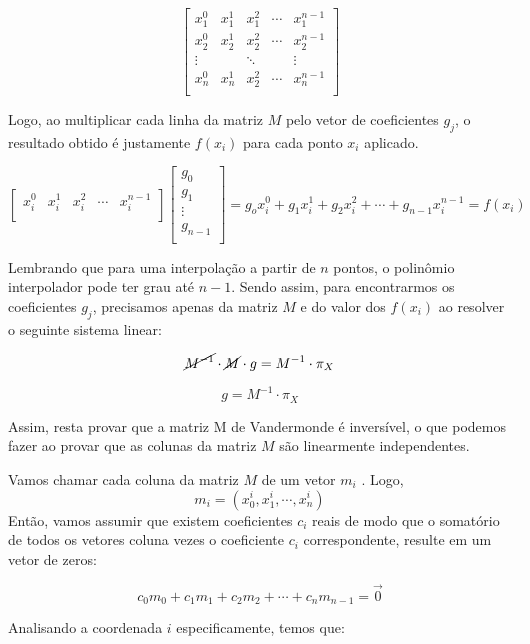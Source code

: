 \documentclass[12pt]{article}
\begin{document}
\begin{enumerate}[1.]
    $$ \begin{bmatrix}
    x_1^0 & x_1^1 & x_1^2 & \cdots &x_1^{n-1}\\
    x_2^0 & x_2^1 & x_2^2 & \cdots &x_2^{n-1}\\
    \vdots & & \ddots & & \vdots \\ 
    x_n^0 & x_n^1 & x_2^2 & \cdots &x_n^{n-1}\\
    \end{bmatrix} $$
    
    Logo, ao multiplicar cada linha da matriz $M$ pelo vetor de coeficientes $g_j$, o resultado obtido é justamente $f(x_i)$ para cada ponto $x_i$ aplicado. 
    
     $$ \begin{bmatrix}
    x_i^0 & x_i^1 & x_i^2 & \cdots &x_i^{n-1}\\

    \end{bmatrix} \begin{bmatrix}  g_0 \\ g_1 \\ \vdots \\ g_{n-1}\\ \end{bmatrix}  = g_o x_i^0 + g_1 x_i^1 +  g_2 x_i^2 + \cdots + g_{n-1} x_i^{n-1} = f(x_i)$$
    
    
    Lembrando que para uma interpolação a partir de $n$ pontos, o polinômio interpolador pode ter grau até $n-1$. Sendo assim, para encontrarmos os coeficientes $g_j$, precisamos apenas da matriz $M$ e do valor dos $f(x_i)$ ao resolver o seguinte sistema linear: 
    
     $$ \cancel{M^{-1}} \cdot \cancel M \cdot g = M^{-1} \cdot  \pi _X $$
     
    
     $$  g = M^{-1} \cdot  \pi _X $$
     
     Assim, resta provar que a matriz M de Vandermonde é inversível, o que podemos fazer ao provar que as colunas da matriz $M$ são linearmente independentes. 
     
     Vamos chamar cada coluna da matriz $M$ de um vetor $m_i$ . Logo,
     $$ m_i = ( x_0^i, x_1^i, \cdots , x_n^i )$$
     Então, vamos assumir que existem coeficientes $c_i$ reais de modo que o somatório de todos os vetores coluna vezes o coeficiente $c_i$ correspondente, resulte em um vetor de zeros:
     
        $$ c_0 m_0 + c_1 m_1 + c_2 m_2 + \cdots + c_n m_{n-1} = \vec 0$$
        
    Analisando a coordenada $i$ especificamente, temos que:
    

\end{enumerate}
\end{document}
